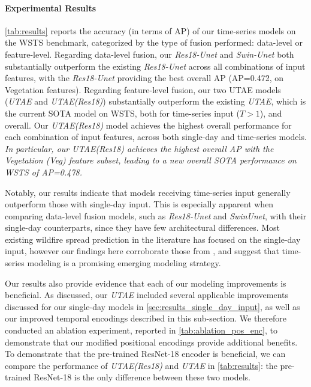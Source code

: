 \paragraph{Experimental Results} \cref{tab:results} reports the accuracy (in terms of AP) of our time-series models on the WSTS benchmark, categorized by the type of fusion performed: data-level or feature-level. Regarding data-level fusion, our \textit{Res18-Unet} and \textit{Swin-Unet} both substantially outperform the existing \textit{Res18-Unet\cite{gerard2023wildfirespreadts}} across all combinations of input features, with the \textit{Res18-Unet} providing the best overall AP (AP=0.472, on Vegetation features).  Regarding feature-level fusion, our two UTAE models (\textit{UTAE} and \textit{UTAE(Res18)}) substantially outperform the existing \textit{UTAE\cite{gerard2023wildfirespreadts}}, which is the current SOTA model on WSTS, both for time-series input ($T>1$), and overall.  Our \textit{UTAE(Res18)} model achieves the highest overall performance for each combination of input features, across both single-day and time-series models.  \textit{In particular, our UTAE(Res18) achieves the highest overall AP with the Vegetation (Veg) feature subset, leading to a new overall SOTA performance on WSTS of AP=0.478.}  

Notably, our results indicate that models receiving time-series input generally outperform those with single-day input.  This is especially apparent when comparing data-level fusion models, such as \textit{Res18-Unet} and \textit{SwinUnet}, with their single-day counterparts, since they have few architectural differences.  Most existing wildfire spread prediction in the literature has focused on the single-day input, however our findings here corroborate those from \cite{gerard2023wildfirespreadts}, and suggest that time-series modeling is a promising emerging modeling strategy.  

Our results also provide evidence that each of our modeling improvements is beneficial.  As discussed, our \textit{UTAE} included several applicable improvements discussed for our single-day models in \cref{sec:results_single_day_input}, as well as our improved temporal encodings described in this sub-section.  We therefore conducted an ablation experiment, reported in \cref{tab:ablation_pos_enc}, to demonstrate that our modified positional encodings provide additional benefits. To demonstrate that the pre-trained ResNet-18 encoder is beneficial, we can compare the performance of \textit{UTAE(Res18)} and \textit{UTAE} in \cref{tab:results}: the pre-trained ResNet-18 is the only difference between these two models.   


